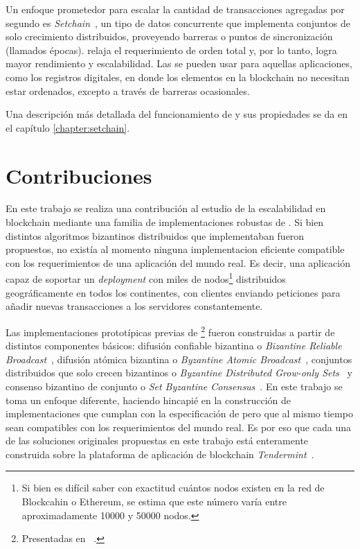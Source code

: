 %
Un enfoque prometedor para escalar la cantidad de transacciones agregadas por segundo
es \textit{Setchain}~\cite{Capretto.2022.Setchain},
un tipo de datos concurrente que implementa conjuntos de solo crecimiento distribuidos,
proveyendo barreras o puntos de sincronización (llamados épocas).
%
\setchain relaja el requerimiento de orden total y, por lo tanto, logra mayor
rendimiento y escalabilidad.
%
Las \setchains se pueden usar para aquellas aplicaciones, como los registros digitales,
en donde los elementos en la blockchain no necesitan estar ordenados, excepto a través
de barreras ocasionales.

Una descripción más detallada del funcionamiento de \setchain y sus propiedades se da
en el capítulo \ref{chapter:setchain}.

\section{Contribuciones}
En este trabajo se realiza una contribución al estudio de la escalabilidad en blockchain mediante 
una familia de implementaciones robustas de \setchain.
%
Si bien distintos algoritmos bizantinos distribuidos que implementaban \setchain fueron
propuestos, no existía al momento ninguna implementacion eficiente compatible con
los requerimientos de una aplicación del mundo real.
Es decir, una aplicación capaz de soportar un \textit{deployment} con miles de nodos\footnote{Si bien
es difícil saber con exactitud cuántos nodos existen en la red de Blockcahin o Ethereum, se estima
que este número varía entre aproximadamente 10000 y 50000 nodos.}
distribuidos geográficamente en todos los continentes, con clientes enviando peticiones para
añadir nuevas transacciones a los servidores constantemente.

Las implementaciones prototípicas previas de \setchain\footnote{Presentadas en ~\cite{Capretto.2022.Setchain}.} fueron construidas
a partir de distintos
componentes básicos: difusión confiable bizantina o \emph{Bizantine Reliable Broadcast}~\cite{DBLP:journals/iandc/Bracha87, raynal.dist.systems},
difusión atómica bizantina o \emph{Byzantine Atomic Broadcast}~\cite{Defago2004BAB},
conjuntos distribuidos que solo crecen bizantinos o \emph{Byzantine Distributed Grow-only Sets}~\cite{Cholvi2021BDSO-arxiv} y
consenso bizantino de conjunto o \emph{Set Byzantine Consensus}~\cite{redbelly}.
%
En este trabajo se toma un enfoque diferente, haciendo hincapié en la construcción de implementaciones
que cumplan con la especificación de \setchain pero que al mismo tiempo sean compatibles con los requerimientos
del mundo real.
Es por eso que cada una de las soluciones originales propuestas en este trabajo está enteramente construida sobre 
la plataforma de aplicación de blockchain \textit{Tendermint}~\cite{Buchman.2018.Tendermint}.

